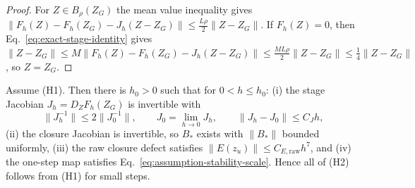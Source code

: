\begin{proof}
For $Z\in B_\rho(Z_G)$ the mean value inequality gives
$\|F_h(Z)-F_h(Z_G)-J_h(Z-Z_G)\|\le\tfrac{L\rho}{2}\|Z-Z_G\|$. If $F_h(Z)=0$, then
Eq.~\eqref{eq:exact-stage-identity} gives
$\|Z-Z_G\|\le M\|F_h(Z)-F_h(Z_G)-J_h(Z-Z_G)\|\le\tfrac{ML\rho}{2}\|Z-Z_G\|\le\tfrac14\|Z-Z_G\|$,
so $Z=Z_G$.
\end{proof}

\begin{lemma}
\label{lem:p2-from-p1}
Assume (H1). Then there is $h_0>0$ such that for $0<h\le h_0$: (i) the stage Jacobian
$J_h=D_ZF_h(Z_G)$ is invertible with
\begin{equation}
  \|J_h^{-1}\|\le 2\|J_0^{-1}\|,\qquad J_0=\lim_{h\to0}J_h,\qquad \|J_h-J_0\|\le C_Jh ,
  \label{eq:p2-perturbation-bound}
\end{equation}
(ii) the closure Jacobian is invertible, so $B_\ast$ exists with $\|B_\ast\|$ bounded uniformly,
(iii) the raw closure defect satisfies $\|E(z_u)\|\le C_{E,\mathrm{raw}}h^7$, and (iv) the one-step
map satisfies Eq.~\eqref{eq:assumption-stability-scale}. Hence all of (H2) follows from (H1) for
small steps.
\end{lemma}

